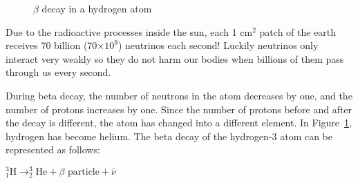 \begin{figure}[!h]
\caption{$\beta$ decay in a hydrogen atom}
\label{fig:beta decay}
\end{figure}

\begin{IFact}
{Due to the radioactive processes inside the sun, each 1 $\text{cm}^{2}$ patch of the earth receives 70 billion (70$\times 10^{9}$) neutrinos each second! Luckily neutrinos only interact very weakly so they do not harm our bodies when billions of them pass through us every second.
}
\end{IFact}

During beta decay, the number of neutrons in the atom decreases by one, and the number of protons increases by one. Since the number of protons before and after the decay is different, the atom has changed into a different element. In Figure~\ref{fig:beta decay}, hydrogen has become helium. The beta decay of the hydrogen-3 atom can be represented as follows:\\

\begin{center}
$^{3}_{1}\text{H} \rightarrow ^{3}_{2}\text{He} + \beta \text{ particle} + \bar{\nu}$
\end{center}



